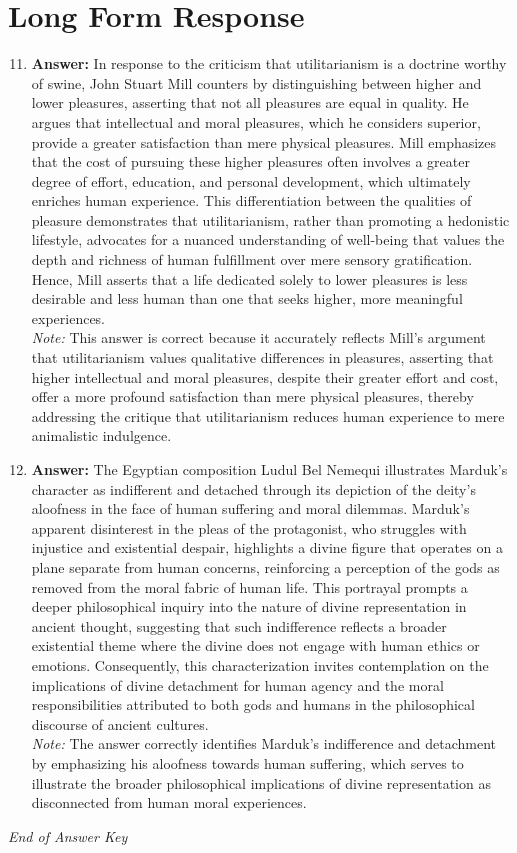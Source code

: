 \documentclass[12pt]{article}
\begin{document}
\section*{Long Form Response}
\begin{enumerate}[label=\arabic*.]
\setcounter{enumi}{10}
\item \textbf{Answer:} In response to the criticism that utilitarianism is a doctrine worthy of swine, John Stuart Mill counters by distinguishing between higher and lower pleasures, asserting that not all pleasures are equal in quality. He argues that intellectual and moral pleasures, which he considers superior, provide a greater satisfaction than mere physical pleasures. Mill emphasizes that the cost of pursuing these higher pleasures often involves a greater degree of effort, education, and personal development, which ultimately enriches human experience. This differentiation between the qualities of pleasure demonstrates that utilitarianism, rather than promoting a hedonistic lifestyle, advocates for a nuanced understanding of well-being that values the depth and richness of human fulfillment over mere sensory gratification. Hence, Mill asserts that a life dedicated solely to lower pleasures is less desirable and less human than one that seeks higher, more meaningful experiences.
\\ \textit{Note:} This answer is correct because it accurately reflects Mill's argument that utilitarianism values qualitative differences in pleasures, asserting that higher intellectual and moral pleasures, despite their greater effort and cost, offer a more profound satisfaction than mere physical pleasures, thereby addressing the critique that utilitarianism reduces human experience to mere animalistic indulgence.
\item \textbf{Answer:} The Egyptian composition Ludul Bel Nemequi illustrates Marduk's character as indifferent and detached through its depiction of the deity's aloofness in the face of human suffering and moral dilemmas. Marduk's apparent disinterest in the pleas of the protagonist, who struggles with injustice and existential despair, highlights a divine figure that operates on a plane separate from human concerns, reinforcing a perception of the gods as removed from the moral fabric of human life. This portrayal prompts a deeper philosophical inquiry into the nature of divine representation in ancient thought, suggesting that such indifference reflects a broader existential theme where the divine does not engage with human ethics or emotions. Consequently, this characterization invites contemplation on the implications of divine detachment for human agency and the moral responsibilities attributed to both gods and humans in the philosophical discourse of ancient cultures.
\\ \textit{Note:} The answer correctly identifies Marduk's indifference and detachment by emphasizing his aloofness towards human suffering, which serves to illustrate the broader philosophical implications of divine representation as disconnected from human moral experiences.
\end{enumerate}

\vfill
\noindent\textit{End of Answer Key}
\end{document}
